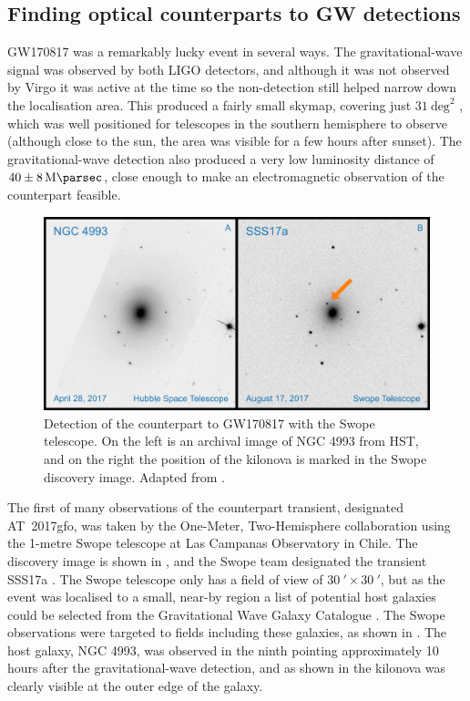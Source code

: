 \subsection{Finding optical counterparts to GW detections}
\label{sec:followup}
\begin{colsection}

GW170817 was a remarkably lucky event in several ways. The gravitational-wave signal was observed by both LIGO detectors, and although it was not observed by Virgo it was active at the time so the non-detection still helped narrow down the localisation area. This produced a fairly small skymap, covering just $31~\text{deg}^2$ \citep[see ]{GW170817}, which was well positioned for telescopes in the southern hemisphere to observe (although close to the sun, the area was visible for a few hours after sunset). The gravitational-wave detection also produced a very low luminosity distance of $40\pm\SI{8}{\mega\parsec}$, close enough to make an electromagnetic observation of the counterpart feasible.

\newpage

\begin{figure}[t]
    \begin{center}
        \includegraphics[width=0.8\linewidth]{images/sss17a.pdf}
    \end{center}
    \caption[Detection of the counterpart to GW170817]{
        Detection of the counterpart to GW170817 with the Swope telescope. On the left is an archival image of NGC 4993 from HST, and on the right the position of the kilonova is marked in the Swope discovery image. Adapted from \citet{GW170817_Swope}.
        }\label{fig:sss17a}
\end{figure}

The first of many observations of the counterpart transient, designated AT~2017gfo, was taken by the One-Meter, Two-Hemisphere collaboration using the 1-metre Swope telescope at Las Campanas Observatory in Chile. The discovery image is shown in , and the Swope team designated the transient SSS17a \citep{GW170817_Swope}. The Swope telescope only has a field of view of $\SI{30}{\arcmin}\times\SI{30}{\arcmin}$, but as the event was localised to a small, near-by region a list of potential host galaxies could be selected from the Gravitational Wave Galaxy Catalogue  \citep[GWGC;][]{GWGC}. The Swope observations were targeted to fields including these galaxies, as shown in . The host galaxy, NGC 4993, was observed in the ninth pointing approximately 10 hours after the gravitational-wave detection, and as shown in  the kilonova was clearly visible at the outer edge of the galaxy.


\end{colsection}
